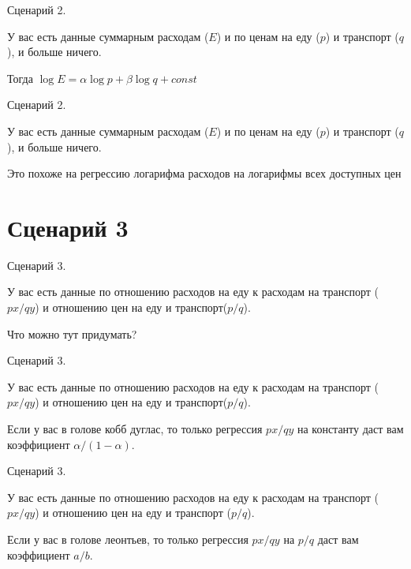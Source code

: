 \documentclass{beamer}
\begin{document}
\begin{frame}{Сценарий 2.}

У вас есть данные суммарным расходам ($E$) и по ценам на еду ($p$) и транспорт ($q$), и больше ничего.

Тогда $\log E = \alpha \log p + \beta \log q + const$

\end{frame}

\begin{frame}{Сценарий 2.}

У вас есть данные суммарным расходам ($E$) и по ценам на еду ($p$) и транспорт ($q$), и больше ничего.

Это похоже на регрессию логарифма расходов на логарифмы всех доступных цен

\end{frame}

\section{Сценарий 3}

\begin{frame}{Сценарий 3.}

У вас есть данные по отношению расходов на еду к расходам на транспорт ($px / q y$) и отношению цен на еду и транспорт($p/q$).

Что можно тут придумать?

\end{frame}

\begin{frame}{Сценарий 3.}

У вас есть данные по отношению расходов на еду к расходам на транспорт ($px / q y$) и отношению цен на еду и транспорт($p/q$).

Если у вас в голове кобб дуглас, то только регрессия $px / q y$ на константу даст вам коэффициент $\alpha/(1-\alpha)$.

\end{frame}

\begin{frame}{Сценарий 3.}

У вас есть данные по отношению расходов на еду к расходам на транспорт ($px / q y$) и отношению цен на еду и транспорт ($p/q$).

Если у вас в голове леонтьев, то только регрессия $px / q y$ на $p/q$ даст вам коэффициент $a/b$.

\end{frame}
\end{document}
